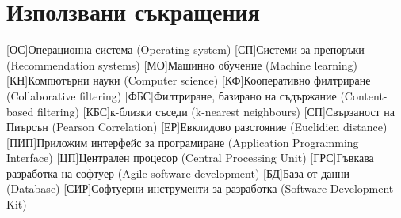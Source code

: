 \chapter{Използвани съкращения}
	\begin{acronym}
		[ОС]{Операционна система (Operating system)}
		[СП]{Системи за препоръки (Recommendation systems)}
		[МО]{Машинно обучение (Machine learning)}
		[КН]{Компютърни науки (Computer science)}
		[КФ]{Кооперативно филтриране (Collaborative filtering)}
		[ФБС]{Филтриране, базирано на съдържание (Content-based filtering)}
		[КБС]{к-близки съседи (k-nearest neighbours)}
		[СП]{Свързаност на Пиърсън (Pearson Correlation)}
		[ЕР]{Евклидово разстояние (Euclidien distance)}
		[ПИП]{Приложим интерфейс за програмиране (Application Programming Interface)}
		[ЦП]{Централен процесор (Central Processing Unit)}
		[ГРС]{Гъвкава разработка на софтуер (Agile software development)}
		[БД]{База от данни (Database)}
		[СИР]{Софтуерни инструменти за разработка (Software Development Kit)}
	\end{acronym}